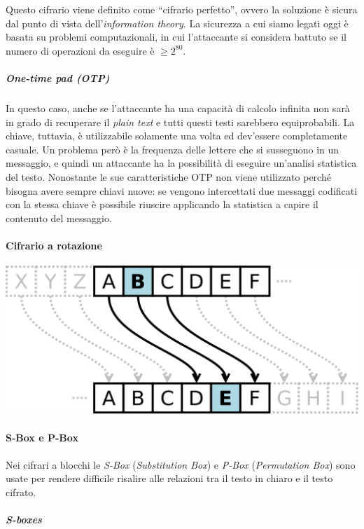 Questo cifrario viene definito come ``cifrario perfetto'', ovvero la soluzione è
sicura dal punto di vista dell'\textit{information theory}. La sicurezza a cui
siamo legati oggi è basata su problemi computazionali, in cui l'attaccante si
considera battuto se il numero di operazioni da eseguire è $\ge 2^{80}$.

\subparagraph*{One-time pad (OTP)}
In questo caso, anche se l'attaccante ha una capacità di calcolo infinita non
sarà in grado di recuperare il \textit{plain text} e tutti questi testi
sarebbero equiprobabili.
La chiave, tuttavia, è utilizzabile solamente una volta ed dev'essere
completamente casuale.
Un problema però è la frequenza delle lettere che si susseguono in un messaggio,
e quindi un attaccante ha la possibilità di eseguire un'analisi statistica del
testo.
Nonostante le sue caratteristiche OTP non viene utilizzato perché bisogna avere
sempre chiavi nuove: se vengono intercettati due messaggi codificati con la
stessa chiave è possibile riuscire applicando la statistica a capire il
contenuto del messaggio.

\paragraph{Cifrario a rotazione}

\begin{center}
  \includegraphics[scale=0.2]{res/img/caesar.png}
  \label{fig:password:caesar}
\end{center}

\paragraph{S-Box e P-Box}
Nei cifrari a blocchi le \textit{S-Box} (\textit{Substitution Box})
e \textit{P-Box} (\textit{Permutation Box}) sono usate per rendere
difficile risalire alle relazioni tra il testo in chiaro e il testo
cifrato. 
\subparagraph*{S-boxes}


